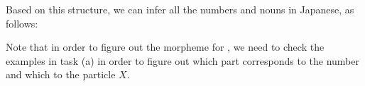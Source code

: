 \begin{refsection}
\begin{mysolution}
Based on this structure, we can infer all the numbers and nouns in Japanese, as follows:


 Note that in order to figure out the morpheme for , we need to check the examples in task (a) in order to figure out which part corresponds to the number and which to the particle $X$.



\end{mysolution}
\end{refsection}
